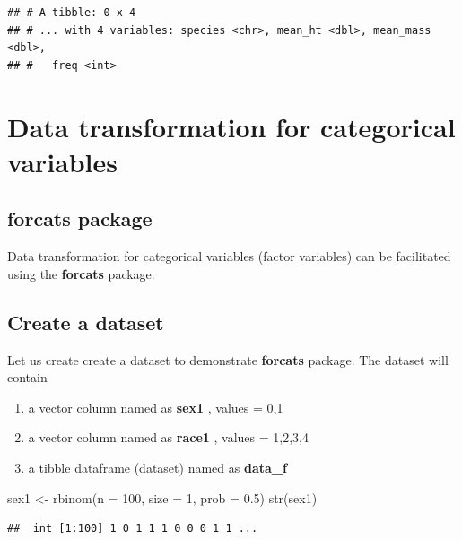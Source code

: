 \documentclass[
]{book}
\makeatletter
\newenvironment{Shaded}{\begin{snugshade}}{\end{snugshade}}
\newcommand{\AttributeTok}[1]{\textcolor[rgb]{0.61,0.61,0.61}{#1}}
\newcommand{\DecValTok}[1]{\textcolor[rgb]{0.06,0.06,0.06}{#1}}
\newcommand{\FloatTok}[1]{\textcolor[rgb]{0.06,0.06,0.06}{#1}}
\newcommand{\FunctionTok}[1]{\textcolor[rgb]{0,0,0}{#1}}
\newcommand{\NormalTok}[1]{#1}
\newcommand{\OtherTok}[1]{\textcolor[rgb]{0.37,0.37,0.37}{#1}}
\providecommand{\tightlist}{%
  \setlength{\itemsep}{0pt}\setlength{\parskip}{0pt}}
\newenvironment{kframe}{%
\medskip{}
\setlength{\fboxsep}{.8em}
 \def\at@end@of@kframe{}%
 \ifinner\ifhmode%
  \def\at@end@of@kframe{\end{minipage}}%
  \begin{minipage}{\columnwidth}%
 \fi\fi%
 \def\FrameCommand##1{\hskip\@totalleftmargin \hskip-\fboxsep
 \colorbox{shadecolor}{##1}\hskip-\fboxsep
     \hskip-\linewidth \hskip-\@totalleftmargin \hskip\columnwidth}%
 \MakeFramed {\advance\hsize-\width
   \@totalleftmargin\z@ \linewidth\hsize
   \@setminipage}}%
 {\par\unskip\endMakeFramed%
 \at@end@of@kframe}
\renewenvironment{Shaded}{\begin{kframe}}{\end{kframe}}
\makeatother
\begin{document}
\begin{verbatim}
## # A tibble: 0 x 4
## # ... with 4 variables: species <chr>, mean_ht <dbl>, mean_mass <dbl>,
## #   freq <int>
\end{verbatim}

\hypertarget{data-transformation-for-categorical-variables}{%
\section{Data transformation for categorical variables}\label{data-transformation-for-categorical-variables}}

\hypertarget{forcats-package}{%
\subsection{\texorpdfstring{\textbf{forcats} package}{forcats package}}\label{forcats-package}}

Data transformation for categorical variables (factor variables) can be facilitated using the \textbf{forcats} package.

\hypertarget{create-a-dataset}{%
\subsection{Create a dataset}\label{create-a-dataset}}

Let us create create a dataset to demonstrate \textbf{forcats} package. The dataset will contain

\begin{enumerate}
\def\labelenumi{\arabic{enumi}.}
\tightlist
\item
  a vector column named as \textbf{sex1} , values = 0,1
\item
  a vector column named as \textbf{race1} , values = 1,2,3,4
\item
  a tibble dataframe (dataset) named as \textbf{data\_f}
\end{enumerate}

\begin{Shaded}
\begin{Highlighting}[]
\NormalTok{sex1 }\OtherTok{\textless{}{-}} \FunctionTok{rbinom}\NormalTok{(}\AttributeTok{n =} \DecValTok{100}\NormalTok{, }\AttributeTok{size =} \DecValTok{1}\NormalTok{, }\AttributeTok{prob =} \FloatTok{0.5}\NormalTok{) }
\FunctionTok{str}\NormalTok{(sex1)}
\end{Highlighting}
\end{Shaded}

\begin{verbatim}
##  int [1:100] 1 0 1 1 1 0 0 0 1 1 ...
\end{verbatim}
\end{document}
